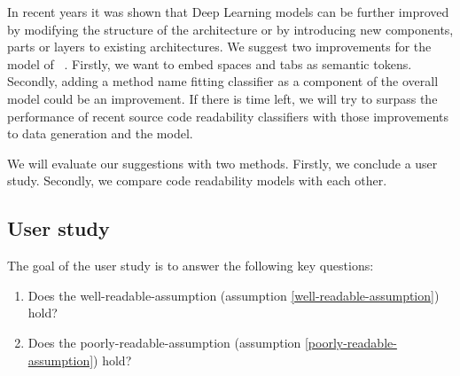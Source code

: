 \documentclass[%
class=scrreprt,
chapterprefix=false,%
open=right,%
twoside=false,%
paper=a4,%
logofile={Logo\_zentral\_farbig\_EN.png},%
thesistype=master,%
UKenglish,%
]{se2thesis}
\begin{document}
	\label{model-modifications}
	In recent years it was shown that Deep Learning models can be further improved by modifying the structure of the architecture or by introducing new components, parts or layers to existing architectures. 
	We suggest two improvements for the model of \citeauthor{mi2022towards}~\cite{mi2022towards}. Firstly, we want to embed spaces and tabs as semantic tokens. Secondly, adding a method name fitting classifier as a component of the overall model could be an improvement.
	\label{suggestions}If there is time left, we will try to surpass the performance of recent source code readability classifiers with those improvements to data generation and the model.
	
	
	We will evaluate our suggestions with two methods. Firstly, we conclude a user study. Secondly, we compare code readability models with each other.
	
	\pagebreak
	
\subsection{User study}\label{user-study}
	The goal of the user study is to answer the following key questions:
	
	\begin{enumerate}
		\item Does the well-readable-assumption (assumption \ref{well-readable-assumption}) hold?
		\item Does the poorly-readable-assumption (assumption \ref{poorly-readable-assumption}) hold?
	\end{enumerate}
	
\end{document}
